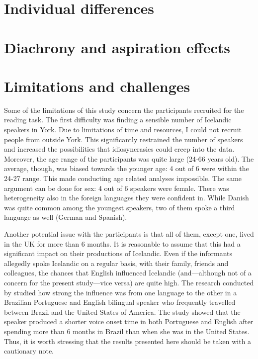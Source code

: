 \documentclass[11pt,a4paper,openany]{memoir}\usepackage[]{graphicx}\usepackage[]{color}
\begin{document}
\section{Individual differences}


\section{Diachrony and aspiration effects}


\section{Limitations and challenges}

Some of the limitations of this study concern the participants recruited for the reading task.
The first difficulty was finding a sensible number of Icelandic speakers in York.
Due to limitations of time and resources, I could not recruit people from outside York.
This significantly restrained the number of speakers and increased the possibilities that idiosyncrasies could creep into the data.
Moreover, the age range of the participants was quite large (24-66 years old).
The average, though, was biased towards the younger age: 4 out of 6 were within the 24-27 range.
This made conducting age related analyses impossible.
The same argument can be done for sex: 4 out of 6 speakers were female.
There was heterogeneity also in the foreign languages they were confident in.
While Danish was quite common among the youngest speakers, two of them spoke a third language as well (German and Spanish).

Another potential issue with the participants is that all of them, except one, lived in the UK for more than 6 months.
It is reasonable to assume that this had a significant impact on their productions of Icelandic.
Even if the informants allegedly spoke Icelandic on a regular basis, with their family, friends and colleagues, the chances that English influenced Icelandic (and---although not of a concern for the present study---vice versa) are quite high.
The research conducted by \citet{sancier1997} studied how strong the influence was from one language to the other in a Brazilian Portuguese and English bilingual speaker who frequently travelled between Brazil and the United States of America.
The study showed that the speaker produced a shorter voice onset time in both Portuguese and English after spending more than 6 months in Brazil than when she was in the United States.
Thus, it is worth stressing that the results presented here should be taken with a cautionary note.
\end{document}
